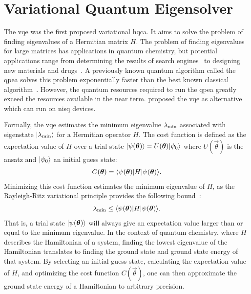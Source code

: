 \section{Variational Quantum Eigensolver}
The \gls{vqe} was the first proposed variational \gls{hqca}.
It aims to solve the problem of finding eigenvalues of a Hermitian matrix $H$.
The problem of finding eigenvalues for large matrices has applications in quantum chemistry, but potential applications range from determining the results of search engines~\cite{page1999pagerank} to designing new materials and drugs~\cite{golub2000eigenvalue}.
A previously known quantum algorithm called the \gls{qpea} solves this problem exponentially faster than the best known classical algorithm~\cite{abrams1999quantum}.
However, the quantum resources required to run the \gls{qpea} greatly exceed the resources available in the near term.
\textcite{peruzzo2014variational} proposed the \gls{vqe} as alternative which can run on \gls{nisq} devices.

Formally, the \gls{vqe} estimates the minimum eigenvalue $\lambda_{\textnormal{min}}$ associated with eigenstate $\vert{\lambda_{\textnormal{min}}}\rangle$ for a Hermitian operator $H$.
The cost function is defined as the expectation value of $H$ over a trial state $\vert{\psi({\bm{\theta}})}\rangle = U(\bm{\theta})\vert{\psi_0}\rangle$ where $U(\vec{\theta})$ is the ansatz and $\vert{\psi_0}\rangle$ an initial guess state:
\begin{equation}
C(\bm{\theta}) = \langle{\psi(\bm{\theta})}\vert H\vert{\psi(\bm{\theta})}\rangle.
\end{equation}
Minimizing this cost function estimates the minimum eigenvalue of $H$, as the Rayleigh-Ritz variational principle provides the following bound~\cite{ritz1909neue}:
\begin{equation}
\lambda_{\textnormal{min}} \leq \langle{\psi(\bm{\theta})}\vert H\vert{\psi(\bm{\theta})}\rangle.
\end{equation}
That is, a trial state $\vert{\psi({\bm{\theta}})}\rangle$ will always give an expectation value larger than or equal to the minimum eigenvalue.
In the context of quantum chemistry, where $H$ describes the Hamiltonian of a system, finding the lowest eigenvalue of the Hamiltonian translates to finding the ground state and ground state energy of that system.
By selecting an initial guess state, calculating the expectation value of $H$, and optimizing the cost function $C(\vec{\theta})$, one can then approximate the ground state energy of a Hamiltonian to arbitrary precision.

